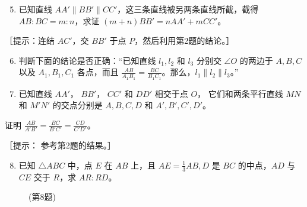 \begin{enumerate}
\setcounter{enumi}{4}
\item
  已知直线
  \(AA' \parallel BB' \parallel CC'\)，这三条直线被另两条直线所截，截得
  \(AB:BC = m:n\)，求证 \((m + n)BB' = nAA' + mCC'\)。
\end{enumerate}

［提示：连结 \(AC'\)，交 \(BB'\) 于点 \(P\)，然后利用第2题的结论。］

\begin{enumerate}
\setcounter{enumi}{5}
\item
  判断下面的结论是否正确：``已知直线 \(l_{1}, l_{2}\) 和 \(l_{3}\)
  分别交 \(\angle O\) 的两边于 \(A, B, C\) 以及 \(A_{1}, B_{1}, C_{1}\)
  各点，而且
  \(\frac{AB}{A_{1}B_{1}} = \frac{BC}{B_{1}C_{1}}\)。那么，\(l_{1} \parallel l_{2} \parallel l_{3}\)。''
\item
  已知直线 \(AA'\)， \(BB'\)， \(CC'\) 和 \(DD'\) 相交于点 \(O\)，
  它们和两条平行直线 \(MN\) 和 \(M'N'\) 的交点分别是 \(A, B, C, D\) 和
  \(A', B', C', D'\)。
\end{enumerate}

证明 \(\frac{AB}{A'B'} = \frac{BC}{B'C'} = \frac{CD}{C'D'}\)。

［提示： 参考第2题的结果。］

\begin{enumerate}
\setcounter{enumi}{7}
\item
  已知 \(\triangle ABC\) 中，点 \(E\) 在 \(AB\) 上，且
  \(AE = \frac{1}{3} AB, D\) 是 \(BC\) 的中点，\(AD\) 与 \(CE\) 交于
  \(R\)，求 \(AR:RD\)。
\end{enumerate}

\begin{figure}
\centering
{}
\caption{(第8题)}
\end{figure}

